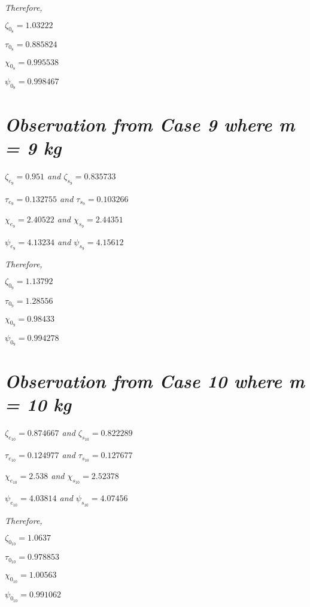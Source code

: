     \textit{Therefore,}
            
    $\zeta_{0_8} = 1.03222$
            
    $\tau_{0_8} = 0.885824$
            
    $\chi_{0_8} = 0.995538$
            
    $\psi_{0_8} = 0.998467$    
            
        
        
\section{\textit{Observation from Case 9 where m = 9 kg}}
        
    \textit{$\zeta_{e_9} = 0.951$ and $\zeta_{s_9} = 0.835733$}
            
    \textit{$\tau_{e_9} = 0.132755$ and $\tau_{s_9} = 0.103266$}
            
    \textit{$\chi_{e_9} = 2.40522$ and $\chi_{s_9} = 2.44351$}
            
    \textit{$\psi_{e_9} = 4.13234$ and $\psi_{s_9} = 4.15612$}
            
    \textit{Therefore,}
            
    $\zeta_{0_9} = 1.13792$
            
    $\tau_{0_9} = 1.28556$
            
    $\chi_{0_9} = 0.98433$
            
    $\psi_{0_9} = 0.994278$    
            
        
        
\section{\textit{Observation from Case 10 where m = 10 kg}}
        
    \textit{$\zeta_{e_{10}} = 0.874667$ and $\zeta_{s_{10}} = 0.822289$}
            
    \textit{$\tau_{e_{10}} = 0.124977$ and $\tau_{s_{10}} = 0.127677$}
            
    \textit{$\chi_{e_{10}} = 2.538$ and $\chi_{s_{10}} = 2.52378$}
            
    \textit{$\psi_{e_{10}} = 4.03814$ and $\psi_{s_{10}} = 4.07456$}
            
    \textit{Therefore,}
            
    $\zeta_{0_{10}} = 1.0637$
            
    $\tau_{0_{10}} = 0.978853$
            
    $\chi_{0_{10}} = 1.00563$
            
    $\psi_{0_{10}} = 0.991062$    
            
        
        




